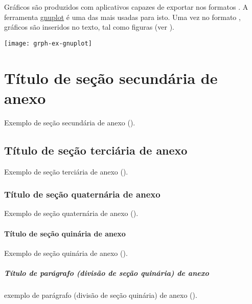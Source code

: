 Gráficos são produzidos com aplicativos capazes de exportar nos formatos .
A ferramenta \href{http://www.gnuplot.info/}{gnuplot\LinkIcon} é uma das mais usadas para isto.
Uma vez no formato , gráficos são inseridos no texto, tal como figuras (ver ).

\begin{graph}[!htbp]
\begin{minipage}{\CaptionWidth}
\caption[%
  Outro exemplo de gráfico, produzido em gnuplot a partir de arquivo de %
]{%
  Outro exemplo de gráfico, produzido em gnuplot a partir de arquivo de \footnote{\texttt{grph-ex-gnuplot.plt} em \texttt{./Post-Textual/Illustrations/}.}%
}%
\label{grph:ex-gnuplot}
\texttt{[image: grph-ex-gnuplot]}
\end{minipage}
\end{graph}

\section{Título de seção secundária de anexo}%
\label{sect:anx-b2}

Exemplo de seção secundária de anexo ().

\subsection{Título de seção terciária de anexo}%
\label{ssect:anx-b3}

Exemplo de seção terciária de anexo ().

\subsubsection{Título de seção quaternária de anexo}%
\label{sssect:anx-b4}

Exemplo de seção quaternária de anexo ().

\paragraph{Título de seção quinária de anexo}%
\label{prgh:anx-b5}

Exemplo de seção quinária de anexo ().

\subparagraph{Título de parágrafo (divisão de seção quinária) de anexo}%
\label{sprgh:anx-b6}

exemplo de parágrafo (divisão de seção quinária) de anexo ().
